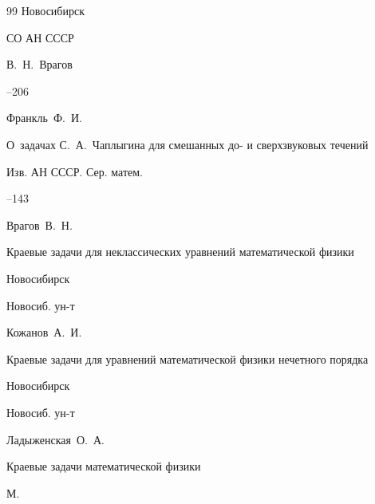 \begin{thebibliography}{99}
\publaddr Новосибирск

\publ СО АН СССР

\ed В.~Н.~Врагов


--206





\by Франкль~Ф.~И.

\paper О~задачах С.~А.~Чаплыгина для смешанных до- и сверхзвуковых течений

\jour Изв. АН СССР. Сер. матем.




--143









\by Врагов~В.~Н.

\book Краевые задачи для неклассических уравнений математической физики

\publaddr Новосибирск

\publ Новосиб. ун-т








\by Кожанов~А.~И.

\book Краевые задачи для уравнений математической физики нечетного порядка

\publaddr Новосибирск

\publ Новосиб. ун-т








\by Ладыженская~О.~А.

\book Краевые задачи математической физики

\publaddr М.


\end{thebibliography}
